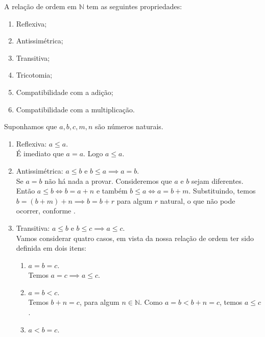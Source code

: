 \documentclass[../main.tex]{subfiles}
\begin{document}
\begin{teo}\label{nat-teo-relacaoOrdemPropriedades}
    A relação de ordem em $\mathbb{N}$ tem as seguintes propriedades:
    \begin{enumerate}[label=(\roman*)]
        \item Reflexiva;
        \item Antissimétrica;
        \item Transitiva;
        \item Tricotomia;
        \item Compatibilidade com a adição;
        \item Compatibilidade com a multiplicação.
    \end{enumerate}
\end{teo}
\begin{dem}
    Suponhamos que $a,b,c,m,n$ são números naturais.
    \begin{enumerate}[label=(\roman*)]
        \item Reflexiva: $ a \leq a$. \\
            É imediato que $a = a$. Logo $ a \leq a$.
        \item Antissimétrica: $a \leq b \text{ e } b \leq a \implies a=b$. \\
            Se $a=b$ não há nada a provar. Consideremos que $a$ e $b$ sejam diferentes. \\
            Então $a \leq b \iff b = a + n$ e também $b \leq a \iff a = b + m$. Substituindo, temos $b = (b+m) + n \implies b = b+r$ para algum $r$ natural, o que não pode ocorrer, conforme . %
        \item Transitiva: $a \leq b \text{ e } b \leq c \implies a \leq c$. \\
            Vamos considerar quatro casos, em vista da nossa relação de ordem ter sido definida em dois itens:
            \begin{enumerate}[label=(\arabic*)]
                \item $a = b = c$. \\
                    Temos $a = c \implies a \leq c$. 
                \item $a = b < c$. \\
                    Temos $b+n = c$, para algum $n \in \mathbb{N}$. Como $a=b < b+ n = c$, temos $a \leq c$.
                \item $a < b = c$. \\

\end{enumerate}
\end{enumerate}
\end{dem}
\end{document}
